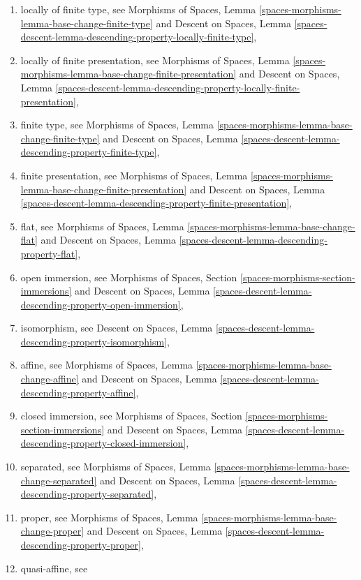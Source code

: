 \documentclass{stacks-project}
\theoremstyle{plain}
\theoremstyle{definition}
\theoremstyle{remark}
\numberwithin{equation}{subsection}
\begin{document}
\begin{enumerate}
and
Descent on Spaces,
Lemma \ref{spaces-descent-lemma-descending-property-universally-injective},
\item locally of finite type, see
Morphisms of Spaces,
Lemma \ref{spaces-morphisms-lemma-base-change-finite-type}
and
Descent on Spaces,
Lemma \ref{spaces-descent-lemma-descending-property-locally-finite-type},
\item locally of finite presentation, see
Morphisms of Spaces,
Lemma \ref{spaces-morphisms-lemma-base-change-finite-presentation}
and
Descent on Spaces, Lemma
\ref{spaces-descent-lemma-descending-property-locally-finite-presentation},
\item finite type, see
Morphisms of Spaces,
Lemma \ref{spaces-morphisms-lemma-base-change-finite-type}
and
Descent on Spaces,
Lemma \ref{spaces-descent-lemma-descending-property-finite-type},
\item finite presentation, see
Morphisms of Spaces,
Lemma \ref{spaces-morphisms-lemma-base-change-finite-presentation}
and
Descent on Spaces, Lemma
\ref{spaces-descent-lemma-descending-property-finite-presentation},
\item flat, see
Morphisms of Spaces,
Lemma \ref{spaces-morphisms-lemma-base-change-flat}
and
Descent on Spaces,
Lemma \ref{spaces-descent-lemma-descending-property-flat},
\item open immersion, see
Morphisms of Spaces,
Section \ref{spaces-morphisms-section-immersions}
and
Descent on Spaces,
Lemma \ref{spaces-descent-lemma-descending-property-open-immersion},
\item isomorphism, see
Descent on Spaces,
Lemma \ref{spaces-descent-lemma-descending-property-isomorphism},
\item affine, see
Morphisms of Spaces,
Lemma \ref{spaces-morphisms-lemma-base-change-affine}
and
Descent on Spaces,
Lemma \ref{spaces-descent-lemma-descending-property-affine},
\item closed immersion, see
Morphisms of Spaces, Section \ref{spaces-morphisms-section-immersions}
and
Descent on Spaces,
Lemma \ref{spaces-descent-lemma-descending-property-closed-immersion},
\item separated, see
Morphisms of Spaces,
Lemma \ref{spaces-morphisms-lemma-base-change-separated}
and
Descent on Spaces,
Lemma \ref{spaces-descent-lemma-descending-property-separated},
\item proper, see
Morphisms of Spaces,
Lemma \ref{spaces-morphisms-lemma-base-change-proper}
and
Descent on Spaces,
Lemma \ref{spaces-descent-lemma-descending-property-proper},
\item quasi-affine, see

\end{enumerate}
\end{document}
